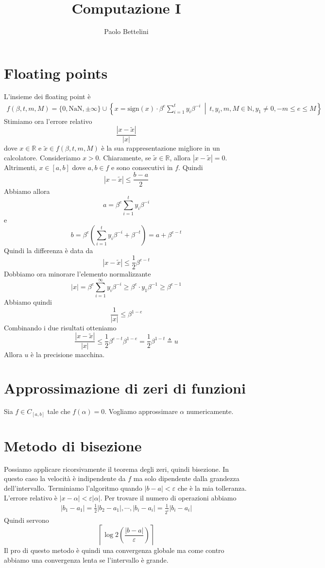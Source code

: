 \documentclass[a4paper]{article}
\title{Computazione I}
\author{Paolo Bettelini}
\date{}
\begin{document}
\maketitle
\tableofcontents

\section{Floating points}

L'insieme dei floating point è
\begin{align*}
    f(\beta, t, m, M) = \{0, \text{NaN}, \pm\infty\} \cup
    \left\{x = \text{sign}(x) \cdot \beta^e \sum_{i=1}^t y_i \beta^{-i} \ \middle|\ 
    t,y_i,m,M \in \mathbb{N}, y_1 \neq 0, -m\leq e \leq M \right\}
\end{align*}
Stimiamo ora l'errore relativo
\[
    \frac{|x-\tilde x|}{|x|}
\]
dove \(x\in\mathbb{R}\) e \(\tilde x \in f(\beta, t, m, M)\) è la sua rappresentazione migliore in un calcolatore.
Consideriamo \(x > 0\).
Chiaramente, se \(\tilde x \in \mathbb{R}\), allora \(|x-\tilde x| = 0\).
Altrimenti, \(x\in [a,b]\) dove \(a,b\in f\) e sono consecutivi in \(f\).
Quindi
\[
    |x-\tilde x| \leq \frac{b-a}{2}
\]
Abbiamo allora
\[
    a = \beta^e \sum_{i=1}^t y_i \beta^{-i}
\]
e
\[
    b = \beta^e \left( \sum_{i=1}^t y_i \beta^{-i} + \beta^{-t} \right)
    = a + \beta^{e - t}
\]
Quindi la differenza è data da
\[
    |x - \tilde x| \leq \frac{1}{2}\beta^{e-t}
\]
Dobbiamo ora minorare l'elemento normalizzante
\[
    |x| = \beta^e \sum_{i=1}^\infty y_i\beta^{-i} \geq \beta^e \cdot y_1 \beta^{-1} \geq \beta^{e-1}
\]
Abbiamo quindi
\[
    \frac{1}{|x|} \leq \beta^{1-e}
\]
Combinando i due risultati otteniamo
\[
    \frac{|x-\tilde x|}{|x|} \leq \frac{1}{2}\beta^{e-t} \beta^{1-e}
    = \frac{1}{2} \beta^{1-t} \triangleq u
\]
Allora \(u\) è la precisione macchina.

\section{Approssimazione di zeri di funzioni}

Sia \(f \in C_{[a,b]}\) tale che \(f(\alpha) = 0\). Vogliamo approssimare \(\alpha\) numericamente.

\section{Metodo di bisezione}

Possiamo applicare ricorsivamente il teorema degli zeri, quindi bisezione.
In questo caso la velocità è indipendente da \(f\) ma solo dipendente dalla grandezza
dell'intervallo. Terminiamo l'algoritmo quando \(|b-a| < \varepsilon\) che è la mia tolleranza.
L'errore relativo è \(|x-\alpha| < \varepsilon|\alpha|\).
Per trovare il numero di operazioni abbiamo
\begin{align*}
    |b_1 - a_1| = \frac{1}{2} |b_2 - a_1|, \cdots, |b_i - a_i| = \frac{1}{2^i}|b_i - a_i|
\end{align*}
Quindi servono
\[
    \left\lceil \log2 \left(\frac{|b-a|}{\varepsilon}\right) \right\rceil
\]
Il pro di questo metodo è quindi una convergenza globale ma come contro
abbiamo una convergenza lenta se l'intervallo è grande.
\end{document}
